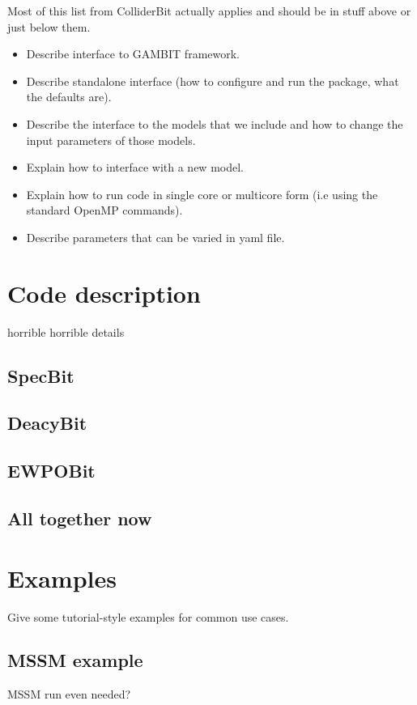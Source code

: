 \documentclass[11pt,a4paper]{article}
\begin{document}
Most of this list from ColliderBit actually applies and should be in stuff above or just below them.
\begin{itemize}
\item Describe interface to GAMBIT framework.
\item Describe standalone interface (how to configure and run the package, what the defaults are).
\item Describe the interface to the models that we include and how to change the input parameters of those models.
\item Explain how to interface with a new model.
\item Explain how to run code in single core or multicore form (i.e using the standard OpenMP commands).
\item Describe parameters that can be varied in yaml file.
\end{itemize}



\section{Code description}
horrible horrible details
\subsection{SpecBit}
\subsection{DeacyBit}
\subsection{EWPOBit}
\subsection{All together now}



\section{Examples}
Give some tutorial-style examples for common use cases.

\subsection{MSSM example}
MSSM run even needed?
\end{document}
